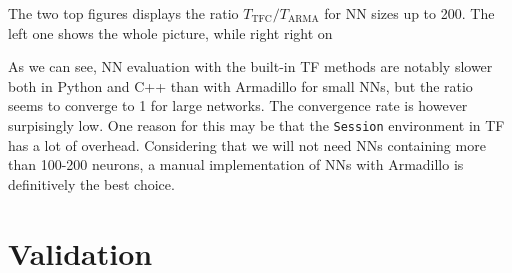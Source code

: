 \documentclass[twoside,english]{uiofysmaster}
\begin{document}

The two top figures displays the ratio $T_{\mathrm{TFC}}/T_{\mathrm{ARMA}}$ for NN sizes up to 200. The left one shows the 
whole picture, while right right on 

As we can see, NN evaluation with the built-in TF methods are notably slower both in Python and C++ than with Armadillo 
for small NNs, but the ratio seems to converge to 1 for large networks. 
The convergence rate is however surpisingly low. One reason for this
may be that the \texttt{Session} environment in TF has a lot of overhead. Considering that we 
will not need NNs containing more than 100-200 neurons, a manual implementation of NNs with Armadillo 
is definitively the best choice. 



\chapter{Validation}
\end{document}

